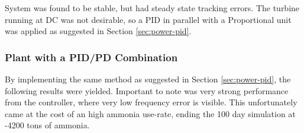 System was found to be stable, but had steady state tracking errors.
The turbine running at DC was not desirable, so a PID in parallel with a Proportional unit was applied as suggested in Section \ref{sec:power-pid}.











\subsubsection{Plant with a PID/PD Combination}

By implementing the same method as suggested in Section \ref{sec:power-pid}, the following results were yielded.
Important to note was very strong performance from the controller, where very low frequency error is visible.
This unfortunately came at the cost of an high ammonia use-rate, ending the 100 day simulation at -4200 tons of ammonia.

